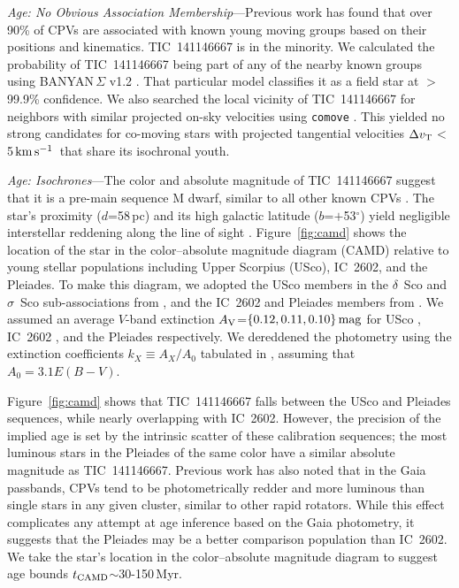 \documentclass{nature3}
\newcommand{\kms}{\ensuremath{\rm km\,s^{-1}}}
\begin{document}
\begin{methods}
{\it Age: No Obvious Association Membership}---Previous work
\cite{Bouma2024} has found that over 90\% of CPVs are associated with
known young moving groups based on their positions and kinematics.
TIC~141146667 is in the minority.  We calculated the probability of
TIC~141146667 being part of any of the nearby known groups using
BANYAN\,$\Sigma$ v1.2 \cite{Gagne2018}.  That particular model
classifies it as a field star at $>$99.9\% confidence.  We also searched
the local vicinity of TIC~141146667 for neighbors with similar projected
on-sky velocities using \texttt{comove} \cite{Tofflemire2021}.  This
yielded no strong candidates for co-moving stars with projected
tangential velocities $\Delta v_{\rm T}$$<$5\,\kms\ that share its
isochronal youth.

{\it Age: Isochrones}---The color and absolute magnitude of
TIC~141146667 suggest that it is a pre-main sequence M dwarf, similar to
all other known CPVs \cite{Stauffer2017,Stauffer2021,Bouma2024}.  The
star's proximity ($d$=58\,pc) and its high galactic latitude
($b$=$+$53$^\circ$) yield negligible interstellar reddening along the
line of sight \cite{Green2019}.  Figure~\ref{fig:camd} shows the
location of the star in the color--absolute magnitude diagram (CAMD)
relative to young stellar populations including Upper Scorpius (USco),
IC~2602, and the Pleiades.  To make this diagram, we adopted the USco
members in the $\delta$~Sco and $\sigma$~Sco sub-associations from
\cite{Ratzenbock2023}, and the IC~2602 and Pleiades members from
\cite{Hunt2024}.  We assumed an average $V$-band extinction $A_{\rm
V}$=$\{0.12, 0.11, 0.10\}\,{\rm mag}$ for USco \cite{Pecaut2016},
IC~2602 \cite{Hunt2024}, and the Pleiades \cite{Hunt2024} respectively.
We dereddened the photometry using the extinction coefficients
$k_X\equiv A_X/A_0$ tabulated in \cite{GaiaCollaboration2018}, assuming
that $A_0 = 3.1 E(B-V)$.

Figure~\ref{fig:camd} shows that TIC~141146667 falls between the USco
and Pleiades sequences, while nearly overlapping with IC~2602.  However,
the precision of the implied age is set by the intrinsic scatter of
these calibration sequences; the most luminous stars in the Pleiades of
the same color have a similar absolute magnitude as TIC~141146667.
Previous work \cite{Stauffer2021} has also noted that in the Gaia
passbands, CPVs tend to be photometrically redder and more luminous than
single stars in any given cluster, similar to other rapid rotators.
While this effect complicates any attempt at age inference based on the
Gaia photometry, it suggests that the Pleiades may be a better
comparison population than IC~2602.  We take the star's
location in the color--absolute magnitude diagram to suggest age bounds
$t_{\rm CAMD}$$\sim$30-150\,Myr.



\end{methods}
\end{document}
